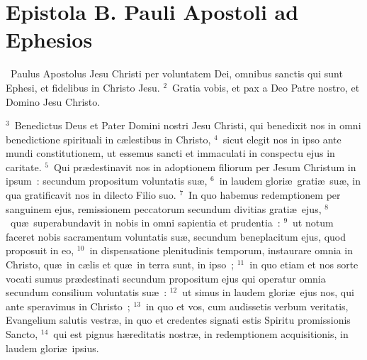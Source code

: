 {\centering \section*{Epistola B. Pauli Apostoli ad Ephesios}}\thispagestyle{empty}

~\lettrine[lines=10,image=true,loversize=0.05,lraise=-0.03]{P}{}aulus Apostolus Jesu Christi per voluntatem Dei, omnibus sanctis qui sunt Ephesi, et fidelibus in Christo Jesu.
${}^{2}$~Gratia vobis, et pax a Deo Patre nostro, et Domino Jesu Christo.


${}^{3}$~Benedictus Deus et Pater Domini nostri Jesu Christi, qui benedixit nos in omni benedictione spirituali in c\ae lestibus in Christo,
${}^{4}$~sicut elegit nos in ipso ante mundi constitutionem, ut essemus sancti et immaculati in conspectu ejus in caritate.
${}^{5}$~Qui pr\ae destinavit nos in adoptionem filiorum per Jesum Christum in ipsum~: secundum propositum voluntatis su\ae ,
${}^{6}$~in laudem glori\ae\ grati\ae\ su\ae , in qua gratificavit nos in dilecto Filio suo.
${}^{7}$~In quo habemus redemptionem per sanguinem ejus, remissionem peccatorum secundum divitias grati\ae\ ejus,
${}^{8}$~qu\ae\ superabundavit in nobis in omni sapientia et prudentia~:
${}^{9}$~ut notum faceret nobis sacramentum voluntatis su\ae , secundum beneplacitum ejus, quod proposuit in eo,
${}^{10}$~in dispensatione plenitudinis temporum, instaurare omnia in Christo, qu\ae\ in c\ae lis et qu\ae\ in terra sunt, in ipso~;
${}^{11}$~in quo etiam et nos sorte vocati sumus pr\ae destinati secundum propositum ejus qui operatur omnia secundum consilium voluntatis su\ae~:
${}^{12}$~ut simus in laudem glori\ae\ ejus nos, qui ante speravimus in Christo~;
${}^{13}$~in quo et vos, cum audissetis verbum veritatis, Evangelium salutis vestr\ae , in quo et credentes signati estis Spiritu promissionis Sancto,
${}^{14}$~qui est pignus h\ae reditatis nostr\ae , in redemptionem acquisitionis, in laudem glori\ae\ ipsius.


